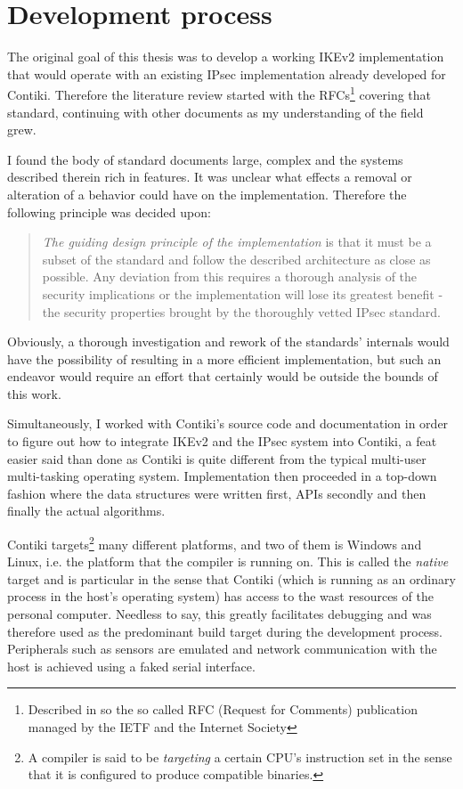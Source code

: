 \documentclass[final,a4paper,twoside,11pt,onecolumn]{report}
\begin{document}

\section{Development process}
The original goal of this thesis was to develop a working IKEv2 implementation that would operate with an existing IPsec implementation already developed for Contiki. Therefore the literature review started with the RFCs\footnote{Described in so the so called RFC (Request for Comments) publication managed by the IETF and the Internet Society} covering that standard, continuing with other documents as my understanding of the field grew.


I found the body of standard documents large, complex and the systems described therein rich in features. It was unclear what effects a removal or alteration of a behavior could have on the implementation. Therefore the following principle was decided upon:

\begin{quotation}
\emph{The guiding design principle of the implementation} is that it must be a subset of the standard and follow the described architecture as close as possible. Any deviation from this requires a thorough analysis of the security implications or the implementation will lose its greatest benefit - the security properties brought by the thoroughly vetted IPsec standard.
\end{quotation}

Obviously, a thorough investigation and rework of the standards' internals would have the possibility of resulting in a more efficient implementation, but such an endeavor would require an effort that certainly would be outside the bounds of this work. 

Simultaneously, I worked with Contiki's source code and documentation in order to figure out how to integrate IKEv2 and the IPsec system into Contiki, a feat easier said than done as Contiki is quite different from the typical multi-user multi-tasking operating system. Implementation then proceeded in a top-down fashion where the data structures were written first, APIs secondly and then finally the actual algorithms.

Contiki targets\footnote{A compiler is said to be \emph{targeting} a certain CPU's instruction set in the sense that it is configured to produce compatible binaries.} many different platforms, and two of them is Windows and Linux, i.e. the platform that the compiler is running on. This is called the \emph{native} target and is particular in the sense that Contiki (which is running as an ordinary process in the host's operating system) has access to the wast resources of the personal computer. Needless to say, this greatly facilitates debugging and was therefore used as the predominant build target during the development process. Peripherals such as sensors are emulated and network communication with the host is achieved using a faked serial interface. 
\end{document}
